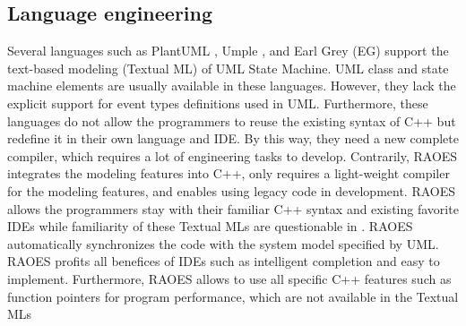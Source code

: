 \subsection{Language engineering}
Several languages such as PlantUML \cite{plantuml}, Umple \cite{lethbridge2010umplification}, and Earl Grey (EG) \cite{mazanec2012general} support the text-based modeling (Textual ML) of UML State Machine.  
UML class and state machine elements are usually available in these languages.
However, they lack the explicit support for event types definitions used in UML.
Furthermore, these languages 
do not allow the programmers to reuse the existing syntax of C++ but redefine it in their own language and IDE. 
By this way, they need a new complete compiler, which requires a lot of engineering tasks to develop. 
Contrarily, RAOES integrates the modeling features into C++, only requires a light-weight compiler for the modeling features, and enables using legacy code in development.
RAOES allows the programmers stay with their familiar C++ syntax and existing favorite IDEs while familiarity of these Textual MLs are questionable in \cite{mazanec2012general}. 
RAOES automatically synchronizes the code with the system model specified by UML.
RAOES profits all benefices of IDEs such as intelligent completion and easy to implement. Furthermore, RAOES allows to use all specific C++ features such as function pointers for program performance, which are not available in the Textual MLs

\begin{comment}
\begin{itemize}[\footnotesize]
	\item RAOES adapts USM features to existing programming languages while Umple or TextUML does inversely, hence RAOES profits all benefices of IDEs such as intelligent completion and easy to implement. Furthermore, RAOES allows to use all specific C++ features such as function pointers for program efficiency, which are not available in the the TMLs.
	
	\item In RAOES, the programmers write and maintain the USM-based behavior part in the same class/file containing the active class.
	
	\item RAOES support full USM features.
	
	\item RAOES automatically synchronizes the code with the system model specified by UML.
	
	\item RAOES defines the state machine topology separately from the transition table and event definition.
\end{itemize}
\end{comment}


